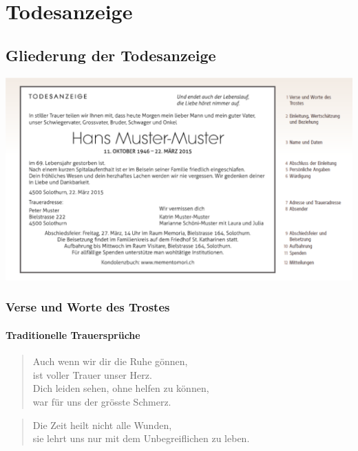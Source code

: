 \documentclass[ngerman,a4paper,11pt]{scrreprt}
\begin{document}
\clearpage

\tableofcontents

\part{Todesanzeige}
\label{sec-1}

\chapter{Gliederung der Todesanzeige}
\label{sec-1-1}

\includegraphics[width=\textwidth]{Bilder/MusterTodesanzeige.png}

\clearpage

\section{Verse und Worte des Trostes}
\label{sec-1-1-1}

\subsection{Traditionelle Trauersprüche}
\label{sec-1-1-1-1}

\begin{verse}
Auch wenn wir dir die Ruhe gönnen, \\
ist voller Trauer unser Herz. \\
Dich leiden sehen, ohne helfen zu können, \\
war für uns der grösste Schmerz. \\
\end{verse}

\begin{verse}
Die Zeit heilt nicht alle Wunden, \\
sie lehrt uns nur mit dem Unbegreiflichen zu leben. \\
\end{verse}
\end{document}
